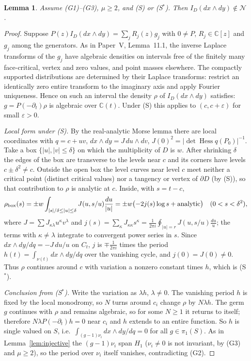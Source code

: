 \documentclass[11pt]{article}
\numberwithin{equation}{section}
\newtheorem{lemma}[theorem]{Lemma}
\theoremstyle{definition}
\theoremstyle{remark}
\newcommand{\C}{\mathbb C}\newcommand{\Q}{\mathbb Q}\newcommand{\R}{\mathbb R}\newcommand{\Z}{\mathbb Z}
\newcommand{\Ncal}{\mathcal N}\newcommand{\Tcal}{\mathcal T}\newcommand{\Bcal}{\mathcal B}
\begin{document}
\begin{lemma}\label{lem:saddle}
Assume \textup{(G1)--(G3)}, $\mu\ge2$, and \textup{(S)} or \textup{(S$^*$)}. Then
$I_D(dx\wedge dy)\notin\Ncal$.
\end{lemma}
\begin{proof}
Suppose $P(z)I_D(dx\wedge dy)=\sum_jR_j(z)g_j$ with $0\ne P$, $R_j\in\C[z]$ and
$g_j$ among the generators. As in Paper~V, Lemma~11.1, the inverse Laplace
transforms of the $g_j$ have algebraic densities on intervals free of the
finitely many face-critical, vertex and zero values, and point masses elsewhere.
The compactly supported distributions are determined by their Laplace
transforms: restrict an identically zero entire transform to the imaginary
axis and apply Fourier uniqueness. Hence on such an interval the density
$\rho$ of $I_D(dx\wedge dy)$ satisfies:
$g=P(-\partial_t)\rho$ is algebraic over $\C(t)$. Under (S) this applies to
$(c,c+\varepsilon)$ for small $\varepsilon>0$.

\emph{Local form under (S).} By the real-analytic Morse lemma there are local
coordinates with $q=c+uv$, $dx\wedge dy=J\,du\wedge dv$,
$J(0)^2=|\det\operatorname{Hess}q(P_0)|^{-1}$. Take a box
$\{|u|,|v|\le\delta\}$ on which the multiplicity of $D$ is $w$. After shrinking $\delta$ the edges of the box are transverse to the levels near
$c$ and its corners have levels $c\pm\delta^2\ne c$. Outside the open
box the level curves near level $c$ meet neither a critical point (distinct
critical values) nor a tangency or vertex of $\partial D$ (by (S)), so that
contribution to $\rho$ is analytic at $c$. Inside, with $s=t-c$,
\[
 \rho_{\rm box}(s)=\pm w\int_{|s|/\delta\le|u|\le\delta}J(u,s/u)\frac{du}{|u|}
 =\pm w\bigl(-2j(s)\log s+\text{analytic}\bigr)\quad(0<s<\delta^2),
\]
where $J=\sum J_{\kappa\lambda}u^\kappa v^\lambda$ and $j(s)=\sum_\kappa J_{\kappa\kappa}s^\kappa
=\frac1{2\pi i}\oint_{|u|=r}J(u,s/u)\frac{du}u$; the terms with
$\kappa\ne\lambda$ integrate to convergent power series in $s$. Since
$dx\wedge dy/dq=-J\,du/u$ on $C_t$, $j$ is $\mp\frac1{2\pi i}$ times the period
$h(t)=\int_{\nu(t)}dx\wedge dy/dq$ over the vanishing cycle, and $j(0)=J(0)\ne0$.
Thus $\rho$ continues around $c$ with variation a nonzero constant times $h$,
which is (S$^*$).

\emph{Conclusion from (S$^*$).} Write the variation as $\lambda h$, $\lambda\ne0$. The
vanishing period $h$ is fixed by the local monodromy, so $N$ turns around
$c_i$ change $\rho$ by $N\lambda h$. The germ $g$ continues with $\rho$ and
remains algebraic, so for some $N\ge1$ it returns to itself; therefore
$N\lambda P(-\partial_t)h=0$ near $c_i$ and $h$ extends to an entire function. So $h$ is
single valued on $S$, i.e.\ $\int_{(g-1)\nu_i}dx\wedge dy/dq=0$ for all
$g\in\pi_1(S)$. As in Lemma~\ref{lem:injective} the $(g-1)\nu_i$ span $H_1$
($\nu_i\ne0$ is not invariant, by (G3) and $\mu\ge2$), so the period over $\nu_i$
itself vanishes, contradicting (G2).
\end{proof}
\end{document}
